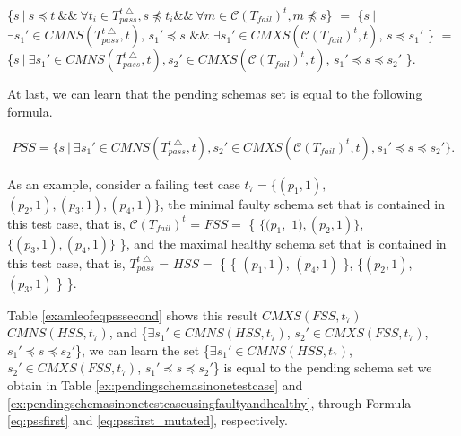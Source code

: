 {\{$s\ |\ s \preceq t\ \&\&\ \forall t_{i} \in T_{pass}^{t\bigtriangleup}, s \npreceq t_{i} \&\&\ \forall m \in \mathcal{C}(T_{fail})^{t}, m \npreceq s   $\} $=$  \{$ s\ |\ $ $\exists s_{1}' \in CMNS(T_{pass}^{t\bigtriangleup}, t)$, $s_{1}' \preceq s$  $\&\&$ $\exists s_{1}' \in CMXS(\mathcal{C}(T_{fail})^{t}, t)$, $s \preceq s_{1}'$  \} $=$  \{$ s\ |\ \exists s_{1}' \in CMNS(T_{pass}^{t\bigtriangleup}, t), s_{2}' \in CMXS(\mathcal{C}(T_{fail})^{t}, t)$, $s_{1}' \preceq s \preceq s_{2}'$ \}.

At last, we can learn that the pending schemas set is equal to the following formula.


\begin{equation}\label{eq:psssecond}
\begin{aligned}
PSS =  \{ s\ |\ \exists s_{1}' \in CMNS(T_{pass}^{t\bigtriangleup}, t), s_{2}' \in CMXS(\mathcal{C}(T_{fail})^{t}, t),  s_{1}' \preceq s \preceq s_{2}' \}.
\end{aligned}
\end{equation}


As an example, consider a failing test case $t_{7} = \{(p_{1}, 1),$ $ (p_{2}, 1), (p_{3}, 1), (p_{4}, 1)\}$, the minimal faulty schema set that is contained in this test case, that is, $\mathcal{C}(T_{fail})^{t}$ = $FSS =$ \{ $\{(p_{1}, $ $1), (p_{2}, 1)\}$, $\{(p_{3}, 1), (p_{4}, 1)\}$ \}, and the maximal healthy schema set that is contained in this test case, that is,  $T_{pass}^{t\bigtriangleup}$ = $HSS =$  \{ \{ $(p_{1}, 1)$, $(p_{4}, 1)$ \}, \{$(p_{2}, 1)$, $(p_{3}, 1)$ \} \}. 


Table \ref{examleofeqpsssecond} shows this result $CMXS(FSS, t_{7})$ $CMNS(HSS, t_{7})$, and \{$\exists s_{1}' \in CMNS(HSS, t_{7})$, $s_{2}' \in CMXS(FSS, t_{7})$, $s_{1}' \preceq s \preceq s_{2}'$\}, we can learn the set \{$\exists s_{1}' \in CMNS(HSS, t_{7})$, $s_{2}' \in CMXS(FSS, t_{7})$, $s_{1}' \preceq s \preceq s_{2}'$\} is equal to the pending schema set we obtain in Table \ref{ex:pendingschemasinonetestcase} and \ref{ex:pendingschemasinonetestcaseusingfaultyandhealthy}, through Formula \ref{eq:pssfirst} and \ref{eq:pssfirst_mutated}, respectively.


}
